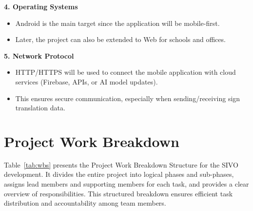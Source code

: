\documentclass[12pt,a4paper,oneside]{report}
\begin{document}
\textbf{4. Operating Systems}
\begin{itemize}
  \item Android is the main target since the application will be mobile-first.
  \item Later, the project can also be extended to Web for schools and offices.
\end{itemize}

\textbf{5. Network Protocol}
\begin{itemize}
  \item HTTP/HTTPS will be used to connect the mobile application with cloud services (Firebase, APIs, or AI model updates).
  \item This ensures secure communication, especially when sending/receiving sign translation data.
\end{itemize}

\section{Project Work Breakdown}

Table~\ref{tab:wbs} presents the Project Work Breakdown Structure for the SIVO development. It divides the entire project into logical phases and sub-phases, assigns lead members and supporting members for each task, and provides a clear overview of responsibilities. This structured breakdown ensures efficient task distribution and accountability among team members.
\end{document}
